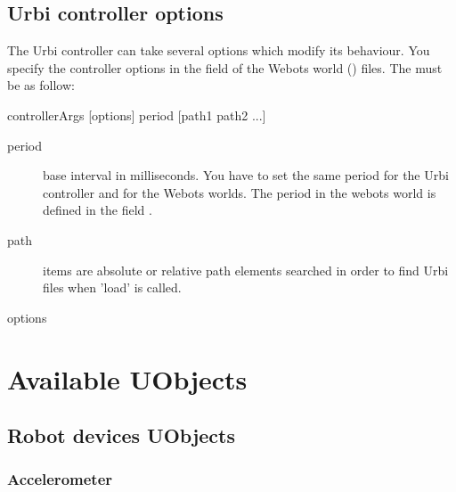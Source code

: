 \subsection{Urbi controller options}
\label{webots.own.controlleroptions}%

The Urbi controller can take several options which modify its
behaviour.  You specify the controller options in the
 field of the Webots world () files.
The  must be as follow:

\begin{shell}
controllerArgs [options] period [path1 path2 ...]
\end{shell}

\begin{description}
\item[period] base \urbi interval in milliseconds. You have to set the
  same period for the Urbi controller and for the Webots worlds. The
  period in the webots world is defined in the field
  .

\item[path] items are absolute or relative path elements searched in
  order to find Urbi files when 'load' is called.

\item[options]
\end{description}


\section{Available UObjects}
\label{webots.uobjects}%

\subsection{Robot devices UObjects}
\label{webots.uobjects.robotdevices}%

\subsubsection{Accelerometer}
\label{webots.uobjects.robotdevices.accelerometer}%

